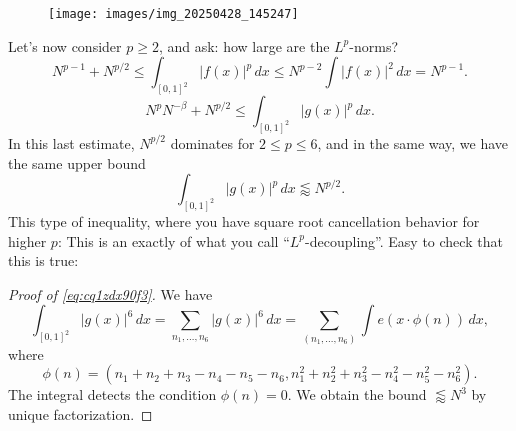 \documentclass[reqno]{amsart} 
\numberwithin{theorem}{section}
\numberwithin{equation}{section}
\begin{document}
\begin{figure}
  \centering
  \texttt{[image: images/img\_20250428\_145247]}
\end{figure}
Let's now consider $p \geq 2$, and ask: how large are the $L^p$-norms?
\begin{equation*}
  N^{p - 1} + N^{p/2} \leq \int_{[0, 1]^2} \lvert f(x) \rvert^p \, d x \leq N^{p - 2} \int \lvert f(x) \rvert^2 \, d x = N^{p - 1}.
\end{equation*}
\begin{equation*}
  N^{p} N^{- \beta} + N^{p/2} \leq \int_{[0, 1]^2}
  \lvert g(x) \rvert^p \, d x.
\end{equation*}
In this last estimate, $N^{p/2}$ dominates for $2 \leq p \leq 6$, and in the same way, we have the same upper bound
\begin{equation}\label{eq:cq1zdx90f3}
  \int_{[0, 1]^2}
  \lvert g(x) \rvert^p \, d x \lessapprox N^{p/2}.
\end{equation}
This type of inequality, where you have square root cancellation behavior for higher $p$: This is an exactly of what you call ``$L^p$-decoupling''.  Easy to check that this is true:
\begin{proof}[Proof of \eqref{eq:cq1zdx90f3}]
  We have
  \begin{equation*}
    \int_{[0, 1]^2} \lvert g(x) \rvert^6 \, d x
    = \sum_{n_1, \dotsc, n_6}
    \lvert g(x) \rvert^6 \, d x
    = \sum_{(n_1, \dotsc, n_6)}
    \int e \left( x \cdot \phi(n) \right) \, d x,
  \end{equation*}
  where
  \begin{equation*}
    \phi(n) =
    (
    n_1 + n_2 + n_3 - n_4 - n_5 - n_6,
    n_1^2 + n_2^2 + n_3^2 - n_4^2 - n_5^2 - n_6^2
    ).
  \end{equation*}
  The integral detects the condition $\phi(n) = 0$.  We obtain the bound $\lessapprox N^3$ by unique factorization.
\end{proof}
\end{document}
